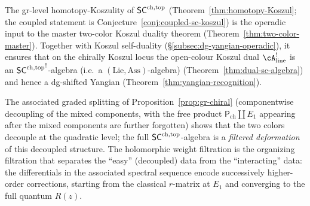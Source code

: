\begin{remark}
\label{rem:two-color-koszul-duality-operadic}
The gr-level homotopy-Koszulity of $\mathsf{SC}^{\mathrm{ch},\mathrm{top}}$
(Theorem~\ref{thm:homotopy-Koszul}; the coupled statement is
Conjecture~\ref{conj:coupled-sc-koszul}) is the operadic input to
the master two-color Koszul duality theorem
(Theorem~\ref{thm:two-color-master}). Together with Koszul
self-duality (\S\ref{subsec:dg-yangian-operadic}), it ensures
that on the chirally Koszul locus the open-colour Koszul dual
$\cA^!_{\mathrm{line}}$ is an ${\mathsf{SC}^{\mathrm{ch},\mathrm{top}}}^{!}$-algebra (i.e.\ a $(\mathrm{Lie},\mathrm{Ass})$-algebra)
\textup{(}Theorem~\textup{\ref{thm:dual-sc-algebra}}\textup{)}
and hence a dg-shifted Yangian
\textup{(}Theorem~\textup{\ref{thm:yangian-recognition}}\textup{)}.

The associated graded splitting of
Proposition~\ref{prop:gr-chiral} (componentwise decoupling of the
mixed components, with the free product
$\mathsf{P}_{\mathrm{ch}} \amalg E_1$ appearing after the mixed
components are further forgotten) shows that the two colors
decouple at the quadratic level; the full $\mathsf{SC}^{\mathrm{ch},\mathrm{top}}$-algebra
is a \emph{filtered deformation} of this decoupled structure.
The holomorphic weight filtration is the organizing filtration
that separates the ``easy'' (decoupled) data from the
``interacting'' data: the differentials in the associated
spectral sequence encode successively higher-order corrections,
starting from the classical $r$-matrix at $E_1$ and converging
to the full quantum $R(z)$.
\end{remark}

